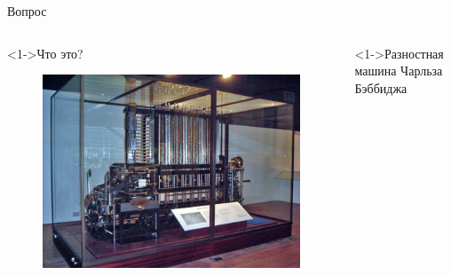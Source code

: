 \documentclass[pdf,9pt,aspectratio=169]{beamer}
\begin{document}
\begin{frame}{Вопрос}
  \begin{columns}[c]
    \begin{column}[]{0.35\textwidth}  
      \begin{alertblock}<1->{Что это?}
        \begin{figure}
          \includegraphics[width=\textwidth]{images/DifferenceEngine.jpg}
        \end{figure}
      \end{alertblock}
    \end{column}
    \begin{column}[]{0.55\textwidth}
      \begin{exampleblock}<1->{Разностная машина Чарльза Бэббиджа}
        \begin{columns}[]
          \column{2cm}

\end{columns}
\end{exampleblock}
\end{column}
\end{columns}
\end{frame}
\end{document}
